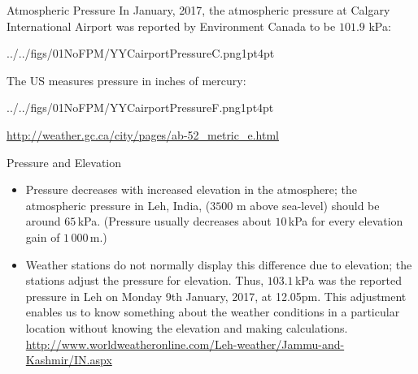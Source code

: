 \documentclass[9pt,xcolor={svgnames, x11names},professionalfonts, mathserif]{beamer}
\begin{document}
\begin{frame}{Atmospheric Pressure}
	In January, 2017, the atmospheric pressure at Calgary International Airport was reported by Environment Canada to be $101.9$ kPa:
	\begin{center}
		\begin{imgboxbg}[white]{0.45}{../../figs/01NoFPM/YYCairportPressureC.png}{1pt}{4pt}
		\end{imgboxbg}
	\end{center}
	The US measures pressure in inches of mercury:
	\begin{center}
		\begin{imgboxbg}[white]{0.45}{../../figs/01NoFPM/YYCairportPressureF.png}{1pt}{4pt}
		\end{imgboxbg}
		\pars\footnotesize
		\href{http://weather.gc.ca/city/pages/ab-52\_metric\_e.html}{http://weather.gc.ca/city/pages/ab-52\_metric\_e.html}
	\end{center}
\end{frame}
\begin{frame}{Pressure and Elevation}
	\begin{itemize}
		\item Pressure decreases with increased elevation in the atmosphere; the
		      atmospheric pressure in Leh, India, ($3500$ m above sea-level) should be around $65\,$kPa. (Pressure usually decreases about $10\,$kPa for every elevation gain of $1\,000\,\text{m}$.) \pause\parm
		\item Weather stations do not normally display this difference due to elevation;
		      the stations adjust the pressure for elevation.
		      Thus, $103.1\,$kPa was the reported pressure in Leh on Monday 9th January, 2017, at 12.05pm. This adjustment enables us to know something about the weather conditions in a particular location without knowing the elevation and making calculations.\pars
		      {\footnotesize \href{http://www.worldweatheronline.com/Leh-weather/Jammu-and-Kashmir/IN.aspx}{http://www.worldweatheronline.com/Leh-weather/Jammu-and-Kashmir/IN.aspx} }
	\end{itemize}
\end{frame}
\end{document}
